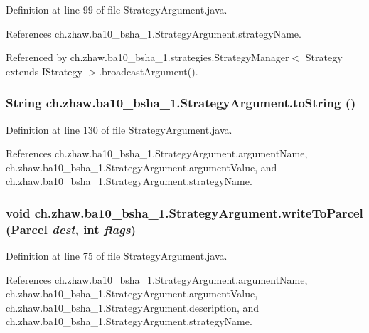 Definition at line 99 of file StrategyArgument.java.

References ch.zhaw.ba10\_\-bsha\_\-1.StrategyArgument.strategyName.

Referenced by ch.zhaw.ba10\_\-bsha\_\-1.strategies.StrategyManager$<$ Strategy extends IStrategy $>$.broadcastArgument().\hypertarget{classch_1_1zhaw_1_1ba10__bsha__1_1_1StrategyArgument_a7ce8d37f25b367e8c67d6579530b0d2f}{
\subsubsection[{toString}]{\setlength{\rightskip}{0pt plus 5cm}String ch.zhaw.ba10\_\-bsha\_\-1.StrategyArgument.toString ()}}
\label{classch_1_1zhaw_1_1ba10__bsha__1_1_1StrategyArgument_a7ce8d37f25b367e8c67d6579530b0d2f}


Definition at line 130 of file StrategyArgument.java.

References ch.zhaw.ba10\_\-bsha\_\-1.StrategyArgument.argumentName, ch.zhaw.ba10\_\-bsha\_\-1.StrategyArgument.argumentValue, and ch.zhaw.ba10\_\-bsha\_\-1.StrategyArgument.strategyName.\hypertarget{classch_1_1zhaw_1_1ba10__bsha__1_1_1StrategyArgument_a08f54b2b1d26e5ac781f2fa04d7fbb2c}{
\subsubsection[{writeToParcel}]{\setlength{\rightskip}{0pt plus 5cm}void ch.zhaw.ba10\_\-bsha\_\-1.StrategyArgument.writeToParcel (Parcel {\em dest}, \/  int {\em flags})}}
\label{classch_1_1zhaw_1_1ba10__bsha__1_1_1StrategyArgument_a08f54b2b1d26e5ac781f2fa04d7fbb2c}


Definition at line 75 of file StrategyArgument.java.

References ch.zhaw.ba10\_\-bsha\_\-1.StrategyArgument.argumentName, ch.zhaw.ba10\_\-bsha\_\-1.StrategyArgument.argumentValue, ch.zhaw.ba10\_\-bsha\_\-1.StrategyArgument.description, and ch.zhaw.ba10\_\-bsha\_\-1.StrategyArgument.strategyName.

